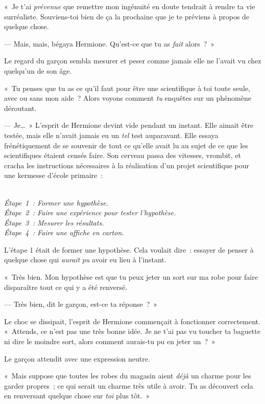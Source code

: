 «~Je t'ai \emph{prévenue} que remettre mon ingénuité en doute tendrait à rendre ta vie surréaliste. Souviens-toi bien de ça la prochaine que je te préviens à propos de quelque chose.

--- Mais, mais, bégaya Hermione. Qu'est-ce que tu as \emph{fait} alors~?~»

Le regard du garçon sembla mesurer et peser comme jamais elle ne l'avait vu chez quelqu'un de son âge.

«~Tu penses que tu as ce qu'il faut pour être une scientifique à toi toute seule, avec ou sans mon aide~? Alors voyons comment \emph{tu} enquêtes sur un phénomène déroutant.

--- Je…~» L'esprit de Hermione devint vide pendant un instant. Elle aimait être testée, mais elle n'avait jamais eu un \emph{tel} test auparavant. Elle essaya frénétiquement de se souvenir de tout ce qu'elle avait lu au sujet de ce que les scientifiques étaient censés faire. Son cerveau passa des vitesses, vrombit, et cracha les instructions nécessaires à la réalisation d'un projet scientifique pour une kermesse d'école primaire~:

\emph{\\ 
Étape~1~: Former une hypothèse.\\
Étape~2~: Faire une expérience pour tester l'hypothèse.\\
Étape~3~: Mesurer les résultats.\\
Étape~4~: Faire une affiche en carton.\\
}

L'étape 1 était de former une hypothèse. Cela voulait dire~: essayer de penser à quelque chose qui \emph{aurait} \emph{pu} avoir eu lieu à l'instant.

«~Très bien. Mon hypothèse est que tu peux jeter un sort sur ma robe pour faire disparaître tout ce qui y a été renversé.

--- Très bien, dit le garçon, est-ce ta réponse~?~»

Le choc se dissipait, l'esprit de Hermione commençait à fonctionner correctement. «~Attends, ce n'est pas une très bonne idée. Je ne t'ai pas vu toucher ta baguette ni dire le moindre sort, alors comment aurais-tu pu en jeter un~?~»

Le garçon attendit avec une expression neutre.

«~Mais suppose que toutes les robes du magasin aient \emph{déjà} un charme pour les garder propres~; ce qui serait un charme très utile à avoir. Tu as découvert cela en renversant quelque chose sur \emph{toi} plus tôt.~»

